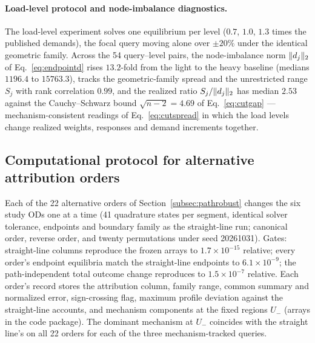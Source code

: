 \paragraph{Load-level protocol and node-imbalance diagnostics.}
The load-level experiment solves one equilibrium per level ($0.7$,
$1.0$, $1.3$ times the published demands), the focal query moving
alone over $\pm20\%$ under the identical geometric family. Across the
54 query--level pairs, the node-imbalance norm $\lVert d_j \rVert_2$ of
Eq.~\eqref{eq:endpointd} rises $13.2$-fold from the light to the
heavy baseline (medians $1196.4$ to $15763.3$), tracks the
geometric-family spread and the unrestricted range $S_j$ with rank
correlation $0.99$, and the realized ratio $S_j/\lVert d_j \rVert_2$ has
median $2.53$ against the Cauchy--Schwarz bound $\sqrt{n-2}=4.69$ of
Eq.~\eqref{eq:cutgap} --- mechanism-consistent readings of
Eq.~\eqref{eq:cutspread} in which the load levels change realized
weights, responses and demand increments together.

\subsection{Computational protocol for alternative attribution orders}\label{supp:pathrobust}
Each of the 22 alternative orders of Section~\ref{subsec:pathrobust}
changes the six study ODs one at a time (41 quadrature states per
segment, identical solver tolerance, endpoints and boundary family as
the straight-line run; canonical order, reverse order, and twenty
permutations under seed 20261031). Gates: straight-line columns
reproduce the frozen arrays to $1.7\times10^{-15}$ relative; every
order's endpoint equilibria match the straight-line endpoints to
$6.1\times10^{-9}$; the path-independent total outcome change
reproduces to $1.5\times10^{-7}$ relative. Each order's record stores
the attribution column, family range, common summary and normalized
error, sign-crossing flag, maximum profile deviation against the
straight-line accounts, and mechanism components at the fixed regions
$U_-$ (arrays in the code package). The dominant mechanism at $U_-$
coincides with the straight line's on all 22 orders for each of the
three mechanism-tracked queries.

